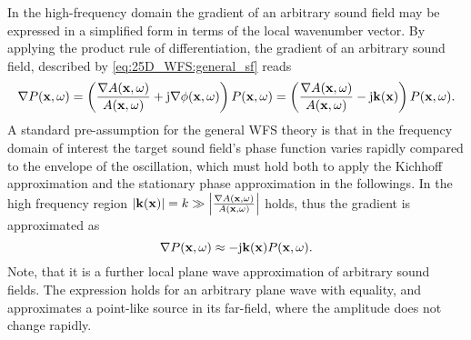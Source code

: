 In the high-frequency domain the gradient of an arbitrary sound field may be expressed in a simplified form in terms of the local wavenumber vector.
By applying the product rule of differentiation, the gradient of an arbitrary sound field, described by \eqref{eq:25D_WFS:general_sf} reads
\begin{equation}
\nabla P(\mathbf{x},\omega) = \left(  \frac{\nabla A(\mathbf{x},\omega)}{A(\mathbf{x},\omega)} + \mathrm{j} \nabla \phi(\mathbf{x},\omega) \right) P(\mathbf{x},\omega) =  \left(  \frac{\nabla A(\mathbf{x},\omega)}{A(\mathbf{x},\omega)} - \mathrm{j} \mathbf{k}(\mathbf{x}) \right) P(\mathbf{x},\omega).
\end{equation}
A standard pre-assumption for the general WFS theory is that in the frequency domain of interest the target sound field's phase function varies rapidly compared to the envelope of the oscillation, which must hold both to apply the Kichhoff approximation and the stationary phase approximation in the followings.
In the high frequency region $|\mathbf{k}(\mathbf{x})| = k \gg \left| \frac{ \nabla A(\mathbf{x},\omega)}{A(\mathbf{x},\omega)} \right|$ holds, thus the gradient is approximated as
\begin{equation}
\nabla P(\mathbf{x},\omega) \approx - \mathrm{j} \mathbf{k}(\mathbf{x}) P(\mathbf{x},\omega).
\label{eq:25D_WFS:gradient_appr}
\end{equation}
Note, that it is a further local plane wave approximation of arbitrary sound fields.
The expression holds for an arbitrary plane wave with equality, and approximates a point-like source in its far-field, where the amplitude does not change rapidly.

